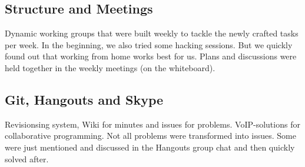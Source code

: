 \subsection{Structure and Meetings}
Dynamic working groups that were built weekly to tackle the newly crafted tasks per week. In the beginning, we also tried some hacking sessions. But we quickly found out that working from home works best for us. Plans and discussions were held together in the weekly meetings (on the whiteboard).
\subsection{Git, Hangouts and Skype}
Revisionsing system, Wiki for minutes and issues for problems. VoIP-solutions for collaborative programming. Not all problems were transformed into issues. Some were just mentioned and discussed in the Hangouts group chat and then quickly solved after.
